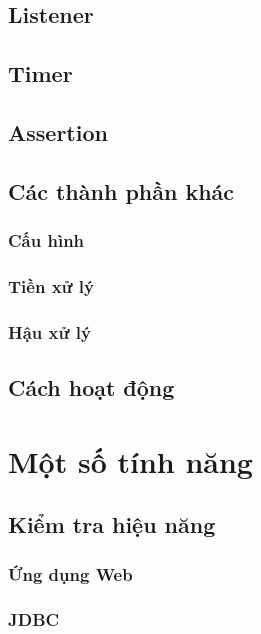 \documentclass[10pt]{report}
\begin{document}
\section{Listener}

\section{Timer}

\section{Assertion}

\section{Các thành phần khác}

\subsection{Cấu hình}
\subsection{Tiền xử lý}
\subsection{Hậu xử lý}

\section{Cách hoạt động}

\chapter{Một số tính năng}

\section{Kiểm tra hiệu năng}

\subsection{Ứng dụng Web}

\subsection{JDBC}
\end{document}
